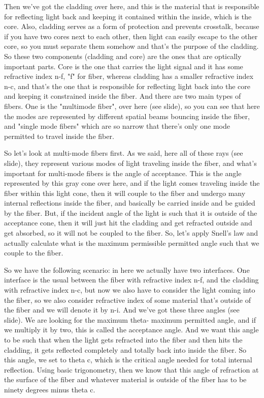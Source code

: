 Then we've got the cladding over here, and this is the material that is responsible for reflecting light back and keeping it contained within the inside, which is the core. Also, cladding serves as a form of protection and prevents crosstalk, because if you have two cores next to each other, then light can easily escape to the other core, so you must separate them somehow and that's the purpose of the cladding. So these two components (cladding and core) are the ones that are optically important parts. Core is the one that carries the light signal and it has some refractive index n-f, "f" for fiber, whereas cladding has a smaller refractive index n-c, and that's the one that is responsible for reflecting light back into the core and keeping it constrained inside the fiber. And there are two main types of fibers. One is the "multimode fiber", over here (see slide), so you can see that here the modes are represented by different spatial beams bouncing inside the fiber, and "single mode fibers" which are so narrow that there's only one mode permitted to travel inside the fiber.

So let's look at multi-mode fibers first. As we said, here all of these rays (see slide), they represent various modes of light traveling inside the fiber, and what's important for multi-mode fibers is the angle of acceptance. This is the angle represented by this gray cone over here, and if the light comes traveling inside the fiber within this light cone, then it will couple to the fiber and undergo many internal reflections inside the fiber, and basically be carried inside and be guided by the fiber. But, if the incident angle of the light is such that it is outside of the acceptance cone, then it will just hit the cladding and get refracted outside and get absorbed, so it will not be coupled to the fiber. So, let's apply Snell's law and actually calculate what is the maximum permissible permitted angle such that we couple to the fiber.

So we have the following scenario: in here we actually have two interfaces. One interface is the usual between the fiber with refractive index n-f, and the cladding with refractive index n-c, but now we also have to consider the light coming into the fiber, so we also consider refractive index of some material that's outside of the fiber and we will denote it by n-i. And we've got these three angles (see slide). We are looking for the maximum theta- maximum permitted angle, and if we multiply it by two, this is called the acceptance angle. And we want this angle to be such that when the light gets refracted into the fiber and then hits the cladding, it gets reflected completely and totally back into inside the fiber. So this angle, we set to theta c, which is the critical angle needed for total internal reflection. Using basic trigonometry, then we know that this angle of refraction at the surface of the fiber and whatever material is outside of the fiber has to be ninety degrees minus theta c.

